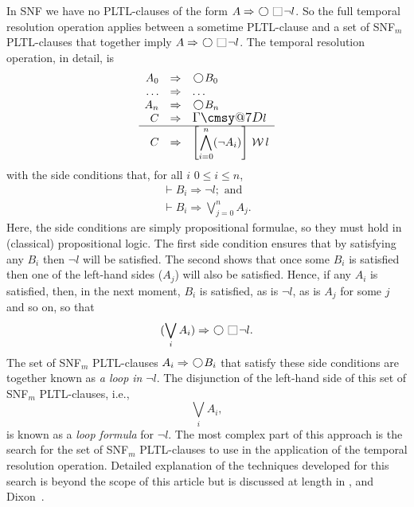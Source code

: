\documentclass[nohyperref]{acmtrans2f}
\makeatletter
\def\sometime{\mathord{\hbox{\large$\mathchar"0\cmsy@7D$}}}
\newcommand{\always}{\raisebox{-.2ex}{
                           \mbox{\unitlength=0.9ex
                           \begin{picture}(2,2)
                           \linethickness{0.06ex}
                           \put(0,0){\line(1,0){2}}
                           \put(0,2){\line(1,0){2}}
                           \put(0,0){\line(0,1){2}}
                           \put(2,0){\line(0,1){2}}
                           \end{picture}}}
                          \,}
\newcommand{\next}{\!\raisebox{-.2ex}{ %
                        \mbox{\unitlength=0.9ex
                        \begin{picture}(2,2)
                        \linethickness{0.06ex}
                        \put(1,1){\circle{2}} %
                        \end{picture}}}       %
                        \,}
\def\unless{\hbox{$\,\cal W \,$}}
\let\imp=\Rightarrow
\let\prv=\vdash
\makeatother
\begin{document}
In SNF we have no PLTL-clauses of the form $A \imp \next \always \neg l$. So the
full temporal resolution operation applies between a sometime PLTL-clause and
a set of SNF$_m$ PLTL-clauses that together imply $A \imp \next \always \neg
l$. The temporal resolution operation, in detail, is
%
$$
\begin{array}{rcl}
A_0  & \Rightarrow & \next B_0\\
\ldots & \Rightarrow & \ldots\\
A_n  & \Rightarrow & \next B_n\\
C  & \Rightarrow & \sometime l \\ \hline
C   & \Rightarrow & \left[\displaystyle\bigwedge_{i=0}^n (\neg A_i)\right] \unless l
\end{array}
$$
%
with the side conditions that, for all $i$ $0 \leq i \leq n$,
$$
\begin{array}{l}
\prv B_i \Rightarrow \neg l; \mbox{ and}\\ 
\prv B_i \Rightarrow \displaystyle \bigvee_{j=0}^n A_j.
\end{array}
$$
Here, the side conditions are simply propositional formulae, so they must hold in
(classical) propositional logic. The first side condition ensures that by
satisfying any $B_i$ then $\neg l$ will be satisfied. The second shows that
once some $B_i$ is satisfied then one of the left-hand sides ($A_j$) will
also be satisfied. Hence, if any $A_i$ is satisfied, then, in the next moment,
$B_i$ is satisfied, as is $\neg l$, as is $A_j$ for some $j$ and so on, so
that 
$$
(\bigvee_i A_i) \imp \next \always \neg l.
$$
The set of SNF$_m$ PLTL-clauses $A_i \imp \next B_i$ that satisfy these side
conditions are together known as {\em a loop in } $\neg l$. The disjunction
of the left-hand side of this set of SNF$_m$ PLTL-clauses, i.e.,
$$
\bigvee_i A_i,
$$
is known as a {\em loop formula} for $\neg l$.
The most complex part of this approach is the search for the set of
SNF$_m$ PLTL-clauses to use in the application of the temporal resolution
operation. Detailed explanation of the techniques developed for this
search is beyond the scope of this article but is discussed at length
in , and Dixon~.
\end{document}
